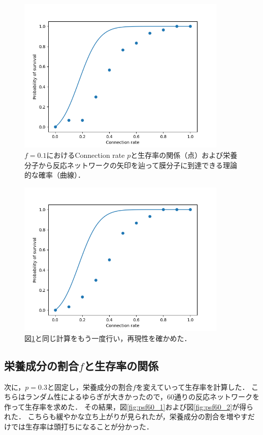 \documentclass[a4paper,11pt]{jsarticle}
\begin{document}
\begin{figure}[htbp]
  \centering
  \includegraphics[width=10cm]{ps30_2.png}
  \caption{$f=0.1$におけるConnection rate $p$と生存率の関係（点）および栄養分子から反応ネットワークの矢印を辿って膜分子に到達できる理論的な確率（曲線）．}
  \label{fig:ps30_2}
\end{figure}

\begin{figure}[htbp]
  \centering
  \includegraphics[width=10cm]{ps30_3.png}
  \caption{図\ref{fig:ps30_2}と同じ計算をもう一度行い，再現性を確かめた．}
  \label{fig:ps30_3}
\end{figure}

\subsection{栄養成分の割合$f$と生存率の関係}
次に，$p=0.3$と固定し，栄養成分の割合$f$を変えていって生存率を計算した．
こちらはランダム性によるゆらぎが大きかったので，60通りの反応ネットワークを作って生存率を求めた．
その結果，図\ref{fig:psf60_1}および図\ref{fig:psf60_2}が得られた．
こちらも緩やかな立ち上がりが見られたが，栄養成分の割合を増やすだけでは生存率は頭打ちになることが分かった．
\end{document}
